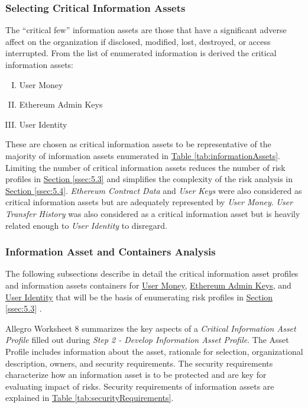 \documentclass[12pt]{article} %
\newcommand{\hypertableref}[1]{\hyperref[#1]{Table \ref{#1}}}
\newcommand{\hypersectionref}[1]{\hyperref[#1]{Section \ref{#1}}}
\begin{document}
{\subsubsection{Selecting Critical Information Assets} \label{sssec:5.2:criticalAssets}

The ``critical few'' information assets are those that have a significant adverse affect on the organization if disclosed, modified, lost, destroyed, or access interrupted. From the list of enumerated information is derived the critical information assets:

\begin{enumerate}[(I)] \label{enum:criticalInformationAssets}
	\item User Money
	\item Ethereum Admin Keys
	\item User Identity
\end{enumerate}

These are chosen as critical information assets to be representative of the majority of information assets enumerated in \hypertableref{tab:informationAssets}. Limiting the number of critical information assets reduces the number of risk profiles in \hypersectionref{ssec:5.3} and simplifies the complexity of the risk analysis in \hypersectionref{ssec:5.4}. \textit{Ethereum Contract Data} and \textit{User Keys} were also considered as critical information assets but are adequately represented by \textit{User Money}. \textit{User Transfer History} was also considered as a critical information asset but is heavily related enough to \textit{User Identity} to disregard.

\subsubsection{Information Asset and Containers Analysis} \label{sssec:5.2:analysis}

The following subsections describe in detail the critical information asset profiles and information assets containers for \hyperref[sssec:5.2:userMoney]{User Money}, \hyperref[sssec:5.2:ethereumAdminKeys]{Ethereum Admin Keys}, and \hyperref[sssec:5.2:userIdentity]{User Identity} that will be the basis of enumerating risk profiles in \hypersectionref{ssec:5.3} .

Allegro Worksheet 8 summarizes the key aspects of a \textit{Critical Information Asset Profile} filled out during \textit{Step 2 - Develop Information Asset Profile}. The Asset Profile includes information about the asset, rationale for selection, organizational description, owners, and security requirements. The security requirements characterize how an information asset is to be protected and are key for evaluating impact of risks. Security requirements of information assets are explained in \hypertableref{tab:securityRequirements}.

}
\end{document}
